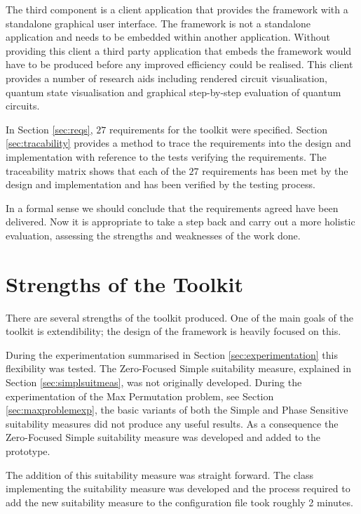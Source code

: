 The third component is a client application that provides the framework with a standalone graphical user interface.
The framework is not a standalone application and needs to be embedded within another application.
Without providing this client a third party application that embeds the framework would have to be produced before any improved efficiency could be realised.
This client provides a number of research aids including rendered circuit visualisation, quantum state visualisation and graphical step-by-step evaluation of quantum circuits.

In Section \ref{sec:reqs}, $27$ requirements for the toolkit were specified.
Section \ref{sec:tracability} provides a method to trace the requirements into the design and implementation with reference to the tests verifying the requirements.
The traceability matrix shows that each of the $27$ requirements has been met by the design and implementation and has been verified by the testing process.

In a formal sense we should conclude that the requirements agreed have been delivered.
Now it is appropriate to take a step back and carry out a more holistic evaluation, assessing the strengths and weaknesses of the work done.

\section{Strengths of the Toolkit}

There are several strengths of the toolkit produced.
One of the main goals of the toolkit is extendibility; the design of the framework is heavily focused on this.

During the experimentation summarised in Section \ref{sec:experimentation} this flexibility was tested.
The Zero-Focused Simple suitability measure, explained in Section \ref{sec:simplsuitmeas}, was not originally developed.
During the experimentation of the Max Permutation problem, see Section \ref{sec:maxproblemexp}, the basic variants of both the Simple and Phase Sensitive suitability measures did not produce any useful results.
As a consequence the Zero-Focused Simple suitability measure was developed and added to the prototype.

The addition of this suitability measure was straight forward.
The class implementing the suitability measure was developed and the process required to add the new suitability measure to the configuration file took roughly 2 minutes.

